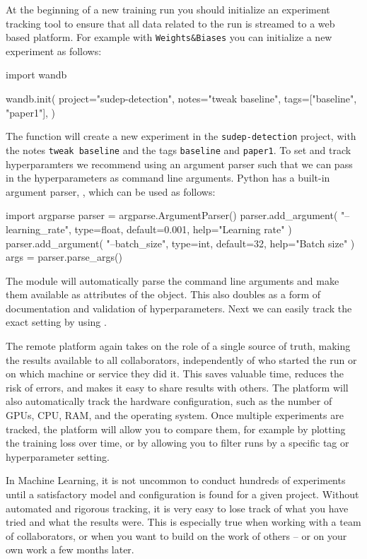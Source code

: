 At the beginning of a new training run you should initialize an experiment tracking tool to ensure that all data related to the run is streamed to a web based platform.
For example with \texttt{Weights\&Biases} you can initialize a new experiment as follows:
\begin{python}
import wandb

wandb.init(
  project="sudep-detection",
  notes="tweak baseline",
  tags=["baseline", "paper1"],
)
\end{python}
The  function will create a new experiment in the \texttt{sudep-detection} project, with the notes \texttt{tweak baseline} and the tags \texttt{baseline} and \texttt{paper1}.
To set and track hyperparamters we recommend using an argument parser such that we can pass in the hyperparameters as command line arguments.
Python has a built-in argument parser, , which can be used as follows:
\begin{python}
import argparse
parser = argparse.ArgumentParser()
parser.add_argument(
    "--learning_rate",
    type=float,
    default=0.001,
    help="Learning rate"
)
parser.add_argument(
    "--batch_size",
    type=int,
    default=32,
    help="Batch size"
)
args = parser.parse_args()
\end{python}
The  module will automatically parse the command line arguments and make them available as attributes of the  object.
This also doubles as a form of documentation and validation of hyperparameters.
Next we can easily track the exact setting by using .

The remote platform again takes on the role of a single source of truth, making the results available to all collaborators, independently of who started the run or on which machine or service they did it.
This saves valuable time, reduces the risk of errors, and makes it easy to share results with others.
The platform will also automatically track the hardware configuration, such as the number of GPUs, CPU, RAM, and the operating system.
Once multiple experiments are tracked, the platform will allow you to compare them, for example by plotting the training loss over time, or by allowing you to filter runs by a specific tag or hyperparameter setting.

In Machine Learning, it is not uncommon to conduct hundreds of experiments until a satisfactory model and configuration is found for a given project.
Without automated and rigorous tracking, it is very easy to lose track of what you have tried and what the results were.
This is especially true when working with a team of collaborators, or when you want to build on the work of others -- or on your own work a few months later.
